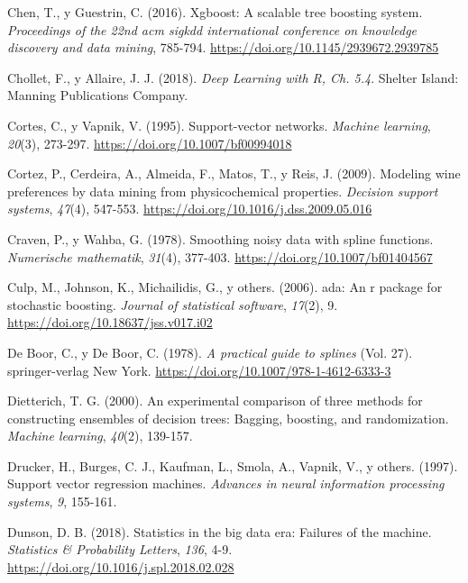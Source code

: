 \documentclass[
  spanish,
]{book}
\theoremstyle{break}
\theoremstyle{definition}
\theoremstyle{definition}
\theoremstyle{definition}
\theoremstyle{remark}
\begin{document}
\leavevmode\hypertarget{ref-chen2016xgboost}{}%
Chen, T., y Guestrin, C. (2016). Xgboost: A scalable tree boosting system. \emph{Proceedings of the 22nd acm sigkdd international conference on knowledge discovery and data mining}, 785-794. \url{https://doi.org/10.1145/2939672.2939785}

\leavevmode\hypertarget{ref-chollet2018deep}{}%
Chollet, F., y Allaire, J. J. (2018). \emph{Deep Learning with R, Ch. 5.4}. Shelter Island: Manning Publications Company.

\leavevmode\hypertarget{ref-cortes1995support}{}%
Cortes, C., y Vapnik, V. (1995). Support-vector networks. \emph{Machine learning}, \emph{20}(3), 273-297. \url{https://doi.org/10.1007/bf00994018}

\leavevmode\hypertarget{ref-cortez2009modeling}{}%
Cortez, P., Cerdeira, A., Almeida, F., Matos, T., y Reis, J. (2009). Modeling wine preferences by data mining from physicochemical properties. \emph{Decision support systems}, \emph{47}(4), 547-553. \url{https://doi.org/10.1016/j.dss.2009.05.016}

\leavevmode\hypertarget{ref-craven1978smoothing}{}%
Craven, P., y Wahba, G. (1978). Smoothing noisy data with spline functions. \emph{Numerische mathematik}, \emph{31}(4), 377-403. \url{https://doi.org/10.1007/bf01404567}

\leavevmode\hypertarget{ref-culp2006ada}{}%
Culp, M., Johnson, K., Michailidis, G., y others. (2006). ada: An r package for stochastic boosting. \emph{Journal of statistical software}, \emph{17}(2), 9. \url{https://doi.org/10.18637/jss.v017.i02}

\leavevmode\hypertarget{ref-de1978practical}{}%
De Boor, C., y De Boor, C. (1978). \emph{A practical guide to splines} (Vol. 27). springer-verlag New York. \url{https://doi.org/10.1007/978-1-4612-6333-3}

\leavevmode\hypertarget{ref-dietterich2000experimental}{}%
Dietterich, T. G. (2000). An experimental comparison of three methods for constructing ensembles of decision trees: Bagging, boosting, and randomization. \emph{Machine learning}, \emph{40}(2), 139-157.

\leavevmode\hypertarget{ref-drucker1997support}{}%
Drucker, H., Burges, C. J., Kaufman, L., Smola, A., Vapnik, V., y others. (1997). Support vector regression machines. \emph{Advances in neural information processing systems}, \emph{9}, 155-161.

\leavevmode\hypertarget{ref-dunson2018statistics}{}%
Dunson, D. B. (2018). Statistics in the big data era: Failures of the machine. \emph{Statistics \& Probability Letters}, \emph{136}, 4-9. \url{https://doi.org/10.1016/j.spl.2018.02.028}
\end{document}
